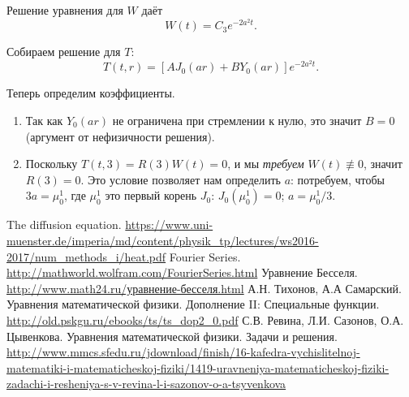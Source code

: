 \documentclass[12pt]{report}
\begin{document}
Решение уравнения для $W$ даёт
\[
W(t) = C_3e^{-2a^2t}.
\]

Собираем решение для $T$:
\[
T(t,r) = \left[AJ_0(ar) + BY_0(ar)\right]e^{-2a^2t}.
\]

Теперь определим коэффициенты.
\begin{enumerate}
	\item Так как $Y_0(ar)$ не ограничена при стремлении к нулю, это значит $B=0$ (аргумент от нефизичности решения).
	\item Поскольку $T(t,3) = R(3)W(t) = 0$, и мы \emph{требуем} $W(t) \not\equiv 0$,
	значит $R(3) = 0$. Это условие позволяет нам определить $a$: потребуем, чтобы $3a = \mu^1_0$, где $\mu^1_0$ это первый корень $J_0$: $J_0(\mu^1_0) = 0$; $a = \mu^1_0/3$. 
\end{enumerate}
 

\begin{thebibliography}{0}
	The diffusion equation.
	\url{https://www.uni-muenster.de/imperia/md/content/physik_tp/lectures/ws2016-2017/num_methods_i/heat.pdf}
	Fourier Series.
	\url{http://mathworld.wolfram.com/FourierSeries.html}
	Уравнение Бесселя.
	\url{http://www.math24.ru/уравнение-бесселя.html}
	А.Н. Тихонов, А.А Самарский. Уравнения математической физики.
	Дополнение II: Специальные функции.
	\url{http://old.pskgu.ru/ebooks/ts/ts_dop2_0.pdf}
	С.В. Ревина, Л.И. Сазонов, О.А. Цывенкова.
	Уравнения математической физики. Задачи и решения.
	\url{http://www.mmcs.sfedu.ru/jdownload/finish/16-kafedra-vychislitelnoj-matematiki-i-matematicheskoj-fiziki/1419-uravneniya-matematicheskoj-fiziki-zadachi-i-resheniya-s-v-revina-l-i-sazonov-o-a-tsyvenkova}
\end{thebibliography}
      
\end{document}
